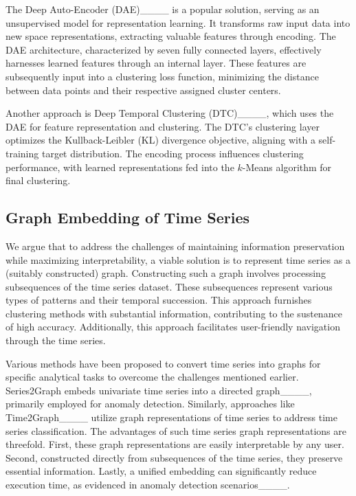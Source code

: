 The Deep Auto-Encoder (DAE)____ is a popular solution, serving as an unsupervised model for representation learning. It transforms raw input data into new space representations, extracting valuable features through encoding. The DAE architecture, characterized by seven fully connected layers, effectively harnesses learned features through an internal layer. These features are subsequently input into a clustering loss function, minimizing the distance between data points and their respective assigned cluster centers.

Another approach is Deep Temporal Clustering (DTC)____, which uses the DAE for feature representation and clustering. The DTC's clustering layer optimizes the Kullback-Leibler (KL) divergence objective, aligning with a self-training target distribution. The encoding process influences clustering performance, with learned representations fed into the $k$-Means algorithm for final clustering.



\subsection{Graph Embedding of Time Series}
\label{sec:graphforts}


We argue that to address the challenges of maintaining information preservation while maximizing interpretability, a viable solution is to represent time series as a (suitably constructed) graph. 
Constructing such a graph involves processing subsequences of the time series dataset. 
These subsequences represent various types of patterns and their temporal succession. This approach furnishes clustering methods with substantial information, contributing to the sustenance of high accuracy. Additionally, this approach facilitates user-friendly navigation through the time series.

Various methods have been proposed to convert time series into graphs for specific analytical tasks to overcome the challenges mentioned earlier. 
Series2Graph embeds univariate time series into a directed graph____, primarily employed for anomaly detection. Similarly, approaches like Time2Graph____ utilize graph representations of time series to address time series classification.
The advantages of such time series graph representations are threefold. 
First, these graph representations are easily interpretable by any user. Second, constructed directly from subsequences of the time series, they preserve essential information. Lastly, a unified embedding can significantly reduce execution time, as evidenced in anomaly detection scenarios____.

